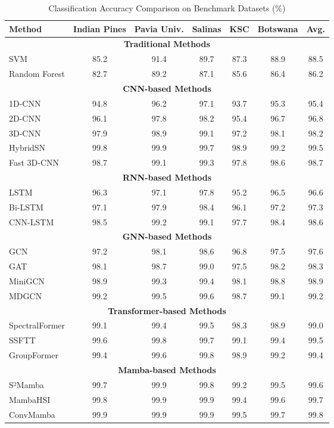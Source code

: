 \documentclass[journal]{IEEEtran}
\begin{document}
\begin{table}[!t]
\renewcommand{\arraystretch}{1.3}
\caption{Classification Accuracy Comparison on Benchmark Datasets (\%)}
\label{tab:accuracy_comparison}
\centering
\begin{tabular}{|l|c|c|c|c|c|c|}
\hline
\textbf{Method} & \textbf{Indian Pines} & \textbf{Pavia Univ.} & \textbf{Salinas} & \textbf{KSC} & \textbf{Botswana} & \textbf{Avg.} \\
\hline
\multicolumn{7}{|c|}{\textbf{Traditional Methods}} \\
\hline
SVM & 85.2 & 91.4 & 89.7 & 87.3 & 88.9 & 88.5 \\
Random Forest & 82.7 & 89.2 & 87.1 & 85.6 & 86.4 & 86.2 \\
\hline
\multicolumn{7}{|c|}{\textbf{CNN-based Methods}} \\
\hline
1D-CNN & 94.8 & 96.2 & 97.1 & 93.7 & 95.3 & 95.4 \\
2D-CNN & 96.1 & 97.8 & 98.2 & 95.4 & 96.7 & 96.8 \\
3D-CNN & 97.9 & 98.9 & 99.1 & 97.2 & 98.1 & 98.2 \\
HybridSN & 99.8 & 99.9 & 99.7 & 98.9 & 99.2 & 99.5 \\
Fast 3D-CNN & 98.7 & 99.1 & 99.3 & 97.8 & 98.6 & 98.7 \\
\hline
\multicolumn{7}{|c|}{\textbf{RNN-based Methods}} \\
\hline
LSTM & 96.3 & 97.1 & 97.8 & 95.2 & 96.5 & 96.6 \\
Bi-LSTM & 97.1 & 97.9 & 98.4 & 96.1 & 97.2 & 97.3 \\
CNN-LSTM & 98.5 & 99.2 & 99.1 & 97.7 & 98.4 & 98.6 \\
\hline
\multicolumn{7}{|c|}{\textbf{GNN-based Methods}} \\
\hline
GCN & 97.2 & 98.1 & 98.6 & 96.8 & 97.5 & 97.6 \\
GAT & 98.1 & 98.7 & 99.0 & 97.5 & 98.2 & 98.3 \\
MiniGCN & 98.9 & 99.3 & 99.4 & 98.1 & 98.8 & 98.9 \\
MDGCN & 99.2 & 99.5 & 99.6 & 98.7 & 99.1 & 99.2 \\
\hline
\multicolumn{7}{|c|}{\textbf{Transformer-based Methods}} \\
\hline
SpectralFormer & 99.1 & 99.4 & 99.5 & 98.3 & 98.9 & 99.0 \\
SSFTT & 99.6 & 99.8 & 99.7 & 99.1 & 99.4 & 99.5 \\
GroupFormer & 99.4 & 99.6 & 99.8 & 98.9 & 99.2 & 99.4 \\
\hline
\multicolumn{7}{|c|}{\textbf{Mamba-based Methods}} \\
\hline
S²Mamba & 99.7 & 99.9 & 99.8 & 99.2 & 99.5 & 99.6 \\
MambaHSI & 99.8 & 99.9 & 99.9 & 99.4 & 99.6 & 99.7 \\
ConvMamba & 99.9 & 99.9 & 99.9 & 99.5 & 99.7 & 99.8 \\
\hline
\end{tabular}
\end{table}
\end{document}
